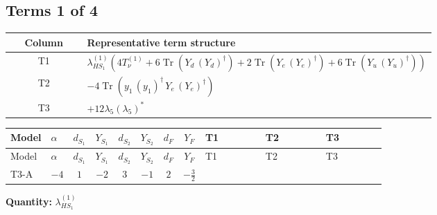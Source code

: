 \documentclass[8pt]{article}
\begin{document}
\begin{landscape}
\subsection*{Terms 1 of 4}
\begin{center}
\begin{tabular}{@{}c >{\raggedright\arraybackslash}p{0.82\linewidth}@{}}
\toprule
Column & Representative term structure \\
\midrule
T1 & \(\displaystyle {\lambda_{HS_1}^{(1)}} (4 T_{\nu}^{(1)}+6 \operatorname{Tr}\!\left({Y_d}\,\left({Y_d}\right)^{\dagger}\right)+2 \operatorname{Tr}\!\left({Y_e}\,\left({Y_e}\right)^{\dagger}\right)+6 \operatorname{Tr}\!\left({Y_u}\,\left({Y_u}\right)^{\dagger}\right))\) \\
\midrule
T2 & \(\displaystyle -4 \operatorname{Tr}\!\left({y_1}\,\left({y_1}\right)^{\dagger}\,{Y_e}\,\left({Y_e}\right)^{\dagger}\right)\) \\
\midrule
T3 & \(\displaystyle +12 {\lambda_5} \left({\lambda_5}\right)^{*}\) \\
\midrule
\bottomrule
\end{tabular}
\end{center}
\smallskip
\tiny
\begin{longtable}{@{}llcccccc >{\raggedright\arraybackslash}p{0.21\linewidth} >{\raggedright\arraybackslash}p{0.21\linewidth} >{\raggedright\arraybackslash}p{0.21\linewidth}@{}}
\toprule
Model & $\alpha$ & $d_{S_1}$ & $Y_{S_1}$ & $d_{S_2}$ & $Y_{S_2}$ & $d_F$ & $Y_F$ & T1 & T2 & T3 \\
\midrule
\endfirsthead
\toprule
Model & $\alpha$ & $d_{S_1}$ & $Y_{S_1}$ & $d_{S_2}$ & $Y_{S_2}$ & $d_F$ & $Y_F$ & T1 & T2 & T3 \\
\midrule
\endhead
T3-A & $-4$ & $1$ & $-2$ & $3$ & $-1$ & $2$ & $-\frac{3}{2}$ & \scriptsize\adjustbox{max width=\linewidth}{$\begin{gathered} {\lambda_{HS_1}^{(1)}} (4 T_{\nu}^{(1)}+6 \operatorname{Tr}\!\left({Y_d}\,\left({Y_d}\right)^{\dagger}\right)+2 \operatorname{Tr}\!\left({Y_e}\,\left({Y_e}\right)^{\dagger}\right)+6 \operatorname{Tr}\!\left({Y_u}\,\left({Y_u}\right)^{\dagger}\right))\end{gathered}$} & \scriptsize\adjustbox{max width=\linewidth}{$\begin{gathered} -4 \operatorname{Tr}\!\left({y_1}\,\left({y_1}\right)^{\dagger}\,{Y_e}\,\left({Y_e}\right)^{\dagger}\right)\end{gathered}$} & \scriptsize\adjustbox{max width=\linewidth}{$\begin{gathered} +12 {\lambda_5} \left({\lambda_5}\right)^{*}\end{gathered}$} \\
\midrule
\bottomrule
\end{longtable}
\clearpage
\noindent\textbf{Quantity: }$\lambda_{HS_1}^{(1)}$\par\smallskip

\end{landscape}
\end{document}
